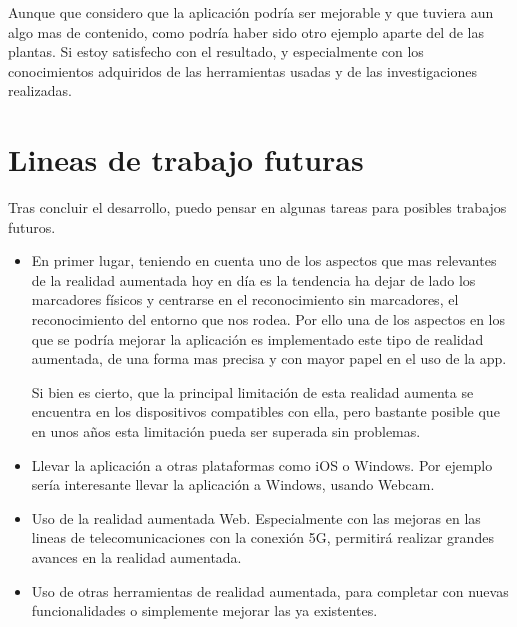 Aunque que considero que la aplicación podría ser mejorable y que tuviera aun algo mas de contenido, como podría haber sido otro ejemplo aparte del de las plantas. Si estoy satisfecho con el resultado, y especialmente con los conocimientos adquiridos de las herramientas usadas y de las investigaciones realizadas.

\section{Lineas de trabajo futuras}
Tras concluir el desarrollo, puedo pensar en algunas tareas para posibles trabajos futuros.
\begin{itemize}
	\item En primer lugar, teniendo en cuenta uno de los aspectos que mas relevantes de la realidad aumentada hoy en día es la tendencia ha dejar de lado los marcadores físicos y centrarse en el reconocimiento sin marcadores, el reconocimiento del entorno que nos rodea.
	Por ello una de los aspectos en los que se podría mejorar la aplicación es implementado este tipo de realidad aumentada, de una forma mas precisa y con mayor papel en el uso de la app.
	
	Si bien es cierto, que la principal limitación de esta realidad aumenta se encuentra en los dispositivos compatibles con ella, pero bastante posible que en unos años esta limitación pueda ser superada sin problemas.
	\item Llevar la aplicación a otras plataformas como iOS o Windows. Por ejemplo sería interesante llevar la aplicación a Windows, usando Webcam.
	\item Uso de la realidad aumentada Web. Especialmente con las mejoras en las lineas de telecomunicaciones con la conexión 5G, permitirá realizar grandes avances en la realidad aumentada.
	\item Uso de otras herramientas de realidad aumentada, para completar con nuevas funcionalidades o simplemente mejorar las ya existentes.
	
\end{itemize}


